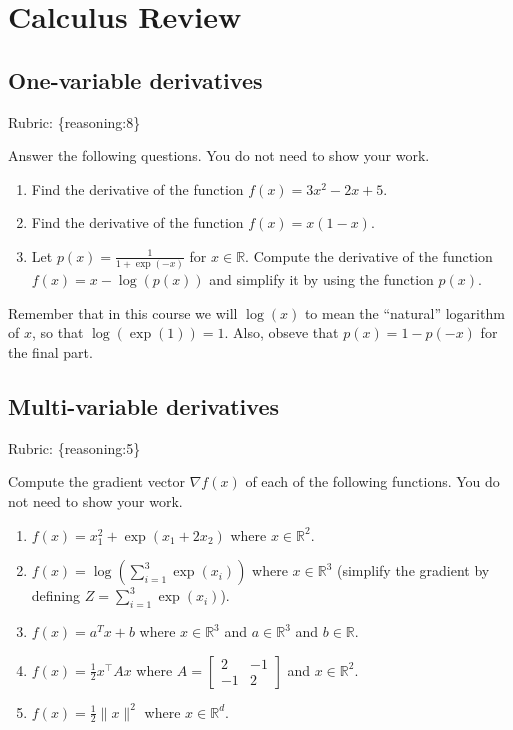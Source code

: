\documentclass{article}
\def\rubric#1{\gre{Rubric: \{#1\}}}{}
\def\blu#1{{\color{blu}#1}}
\def\gre#1{{\color{gre}#1}}
\def\norm#1{\|#1\|}
\def\R{\mathbb{R}}
\def\half{\frac 1 2}
\begin{document}
\section{Calculus Review}



\subsection{One-variable derivatives}
\label{sub.one.var}
\rubric{reasoning:8}

\blu{Answer the following questions.} You do not need to show your work.

\begin{enumerate}
\item Find the derivative of the function $f(x) = 3x^2 -2x + 5$.
\item Find the derivative of the function $f(x) = x(1-x)$.
\item Let $p(x) = \frac{1}{1+\exp(-x)}$ for $x \in \R$. Compute the derivative of the function $f(x) = x-\log(p(x))$ and simplify it by using the function $p(x)$.
\end{enumerate}
Remember that in this course we will $\log(x)$ to mean the ``natural'' logarithm of $x$, so that $\log(\exp(1)) = 1$. Also, obseve that $p(x) = 1-p(-x)$ for the final part.

\subsection{Multi-variable derivatives}
\label{sub.multi.var}
\rubric{reasoning:5}

\blu{Compute the gradient vector $\nabla f(x)$ of each of the following functions.} You do not need to show your work.
\begin{enumerate}
\item $f(x) = x_1^2 + \exp(x_1 + 2x_2)$ where $x \in \R^2$.
\item $f(x) = \log\left(\sum_{i=1}^3\exp(x_i)\right)$ where $x \in \R^3$ (simplify the gradient by defining $Z = \sum_{i=1}^3\exp(x_i)$).
\item $f(x) = a^Tx + b$ where $x \in \R^3$ and $a \in \R^3$ and $b \in \R$.
\item $f(x) = \half x^\top A x$ where $A=\left[ \begin{array}{cc}
2 & -1 \\
 -1 & 2 \end{array} \right]$ and $x \in \mathbb{R}^2$.
 \item $f(x) = \frac{1}{2}\norm{x}^2$ where $x \in \R^d$.
\end{enumerate}
\end{document}
